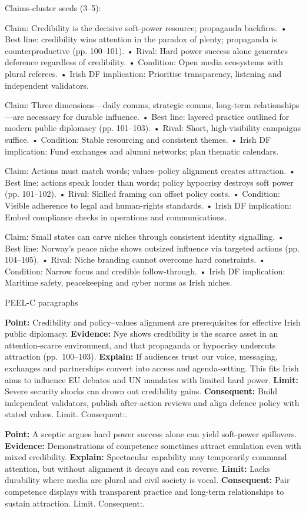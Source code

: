 Claims-cluster seeds (3–5):

Claim: Credibility is the decisive soft-power resource; propaganda backfires.
• Best line: credibility wins attention in the paradox of plenty; propaganda is counterproductive (pp. 100–101).
• Rival: Hard power success alone generates deference regardless of credibility.
• Condition: Open media ecosystems with plural referees.
• Irish DF implication: Prioritise transparency, listening and independent validators.

Claim: Three dimensions—daily comms, strategic comms, long-term relationships—are necessary for durable influence.
• Best line: layered practice outlined for modern public diplomacy (pp. 101–103).
• Rival: Short, high-visibility campaigns suffice.
• Condition: Stable resourcing and consistent themes.
• Irish DF implication: Fund exchanges and alumni networks; plan thematic calendars.

Claim: Actions must match words; values–policy alignment creates attraction.
• Best line: actions speak louder than words; policy hypocrisy destroys soft power (pp. 101–102).
• Rival: Skilled framing can offset policy costs.
• Condition: Visible adherence to legal and human-rights standards.
• Irish DF implication: Embed compliance checks in operations and communications.

Claim: Small states can carve niches through consistent identity signalling.
• Best line: Norway’s peace niche shows outsized influence via targeted actions (pp. 104–105).
• Rival: Niche branding cannot overcome hard constraints.
• Condition: Narrow focus and credible follow-through.
• Irish DF implication: Maritime safety, peacekeeping and cyber norms as Irish niches.

PEEL-C paragraphs

\textbf{Point:} Credibility and policy–values alignment are prerequisites for effective Irish public diplomacy.
\textbf{Evidence:} Nye shows credibility is the scarce asset in an attention-scarce environment, and that propaganda or hypocrisy undercuts attraction (pp.~100–103).
\textbf{Explain:} If audiences trust our voice, messaging, exchanges and partnerships convert into access and agenda-setting. This fits Irish aims to influence EU debates and UN mandates with limited hard power.
\textbf{Limit:} Severe security shocks can drown out credibility gains.
\textbf{Consequent:} Build independent validators, publish after-action reviews and align defence policy with stated values. Limit. Consequent:.

\textbf{Point:} A sceptic argues hard power success alone can yield soft-power spillovers.
\textbf{Evidence:} Demonstrations of competence sometimes attract emulation even with mixed credibility.
\textbf{Explain:} Spectacular capability may temporarily command attention, but without alignment it decays and can reverse.
\textbf{Limit:} Lacks durability where media are plural and civil society is vocal.
\textbf{Consequent:} Pair competence displays with transparent practice and long-term relationships to sustain attraction. Limit. Consequent:.



